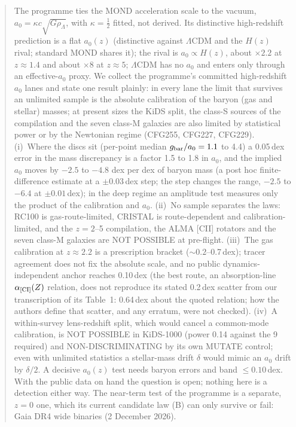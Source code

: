 \documentclass[10pt]{article}
\begin{document}
\begin{abstract}
\noindent The programme ties the MOND acceleration scale to the vacuum, $a_0=\kappa c\sqrt{G\rho_\Lambda}$, with $\kappa=\tfrac12$ fitted, not derived. Its distinctive high-redshift prediction is a flat $a_0(z)$ (distinctive against $\Lambda$CDM and the $H(z)$ rival; standard MOND shares it); the rival is $a_0\propto H(z)$, about $\times2.2$ at $z\approx1.4$ and about $\times8$ at $z\approx5$; $\Lambda$CDM has no $a_0$ and enters only through an effective-$a_0$ proxy. We collect the programme's committed high-redshift $a_0$ lanes and state one result plainly: in every lane the limit that survives an unlimited sample is the absolute calibration of the baryon (gas and stellar) masses; at present sizes the KiDS split, the class-S sources of the compilation and the seven class-M galaxies are also limited by statistical power or by the Newtonian regime (CFG255, CFG227, CFG229). (i)~Where the discs sit (per-point median $g_{\rm bar}/a_0=1.1$ to 4.4) a 0.05\,dex error in the mass discrepancy is a factor 1.5 to 1.8 in $a_0$, and the implied $a_0$ moves by $-2.5$ to $-4.8$ dex per dex of baryon mass (a post hoc finite-difference estimate at a $\pm0.03$\,dex step; the step changes the range, $-2.5$ to $-6.4$ at $\pm0.01$\,dex); in the deep regime an amplitude test measures only the product of the calibration and $a_0$. (ii)~No sample separates the laws: RC100 is gas-route-limited, CRISTAL is route-dependent and calibration-limited, and the $z=2$--5 compilation, the ALMA [CII] rotators and the seven class-M galaxies are NOT POSSIBLE at pre-flight. (iii)~The gas calibration at $z\approx2.2$ is a prescription bracket (${\sim}0.2$--0.7\,dex); tracer agreement does not fix the absolute scale, and no public dynamics-independent anchor reaches 0.10\,dex (the best route, an absorption-line $\alpha_{\rm [CI]}(Z)$ relation, does not reproduce its stated 0.2\,dex scatter from our transcription of its Table~1: 0.64\,dex about the quoted relation; how the authors define that scatter, and any erratum, were not checked). (iv)~A within-survey lens-redshift split, which would cancel a common-mode calibration, is NOT POSSIBLE in KiDS-1000 (power 0.14 against the 9 required) and NON-DISCRIMINATING by its own MUTATE control; even with unlimited statistics a stellar-mass drift $\delta$ would mimic an $a_0$ drift by $\delta/2$. A decisive $a_0(z)$ test needs baryon errors and band $\le0.10$\,dex. With the public data on hand the question is open; nothing here is a detection either way. The near-term test of the programme is a separate, $z=0$ one, which its current candidate law (B) can only survive or fail: Gaia DR4 wide binaries (2 December 2026).
\end{abstract}
\end{document}
